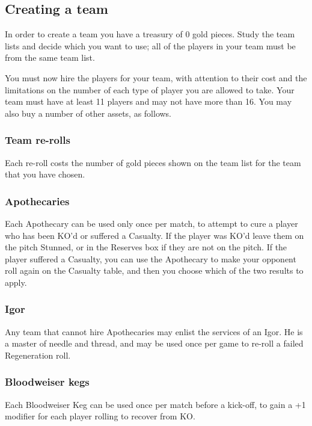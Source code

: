 \documentclass{article}
\begin{document}
\begin{multicols}{2}
\subsection{Creating a team}
\par In order to create a team you have a treasury of 0 gold pieces. Study the team lists and decide which you want to use; all of the players in your team must be from the same team list.
\par You must now hire the players for your team, with attention to their cost and the limitations on the number of each type of player you are allowed to take. Your team must have at least 11 players and may not have more than 16. You may also buy a number of other assets, as follows.

\subsubsection{Team re-rolls}
\par Each re-roll costs the number of gold pieces shown on the team list for the team that you have chosen.

\subsubsection{Apothecaries}
\par Each Apothecary can be used only once per match, to attempt to cure a player who has been KO'd or suffered a Casualty. If the player was KO'd leave them on the pitch Stunned, or in the Reserves box if they are not on the pitch. If the player suffered a Casualty, you can use the Apothecary to make your opponent roll again on the Casualty table, and then you choose which of the two results to apply.

\subsubsection{Igor}
\par Any team that cannot hire Apothecaries may enlist the services of an Igor. He is a master of needle and thread, and may be used once per game to re-roll a failed Regeneration roll.

\subsubsection{Bloodweiser kegs}
\par Each Bloodweiser Keg can be used once per match before a kick-off, to gain a +1 modifier for each player rolling to recover from KO.


\end{multicols}
\end{document}
